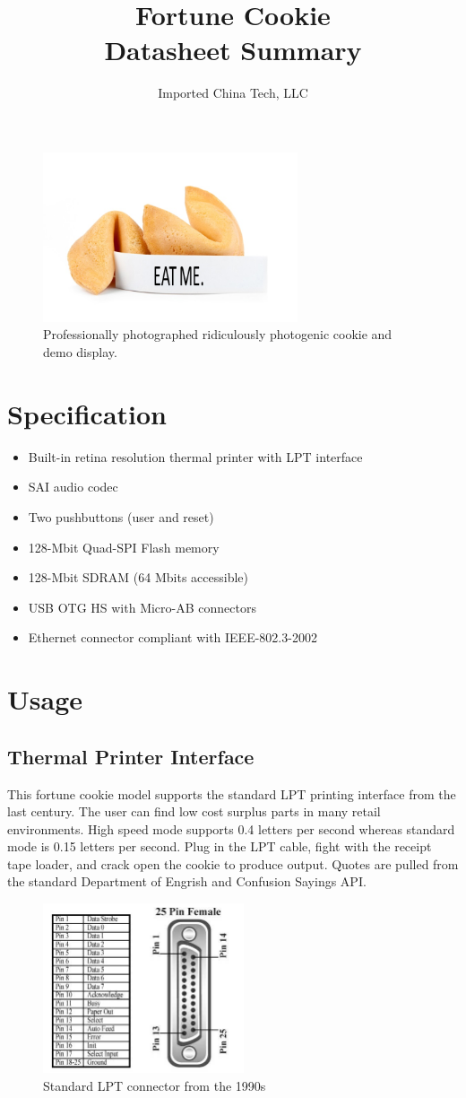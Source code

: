 \documentclass[11pt,twocolumn]{article}
\title{Fortune Cookie\\Datasheet Summary}
\author{Imported China Tech, LLC}
\begin{document}
    \maketitle
  
    \begin{figure}
    \centering
    \includegraphics[height=5cm]{cookie.png}
    \caption{Professionally photographed ridiculously photogenic cookie and demo display.}
    \label{fig:la}
    \end{figure}

\section{Specification}
    \begin{itemize}
        \item Built-in retina resolution thermal printer with LPT interface
        \item SAI audio codec
        \item Two pushbuttons (user and reset)
        \item 128-Mbit Quad-SPI Flash memory
        \item 128-Mbit SDRAM (64 Mbits accessible)
        \item USB OTG HS with Micro-AB connectors
        \item Ethernet connector compliant with IEEE-802.3-2002
    \end{itemize}

\section{Usage}
\subsection{Thermal Printer Interface}
    This fortune cookie model supports the standard LPT printing interface from the last century. The user can find low cost surplus parts in many retail environments. High speed mode supports 0.4 letters per second whereas standard mode is 0.15 letters per second. Plug in the LPT cable, fight with the receipt tape loader, and crack open the cookie to produce output. Quotes are pulled from the standard Department of Engrish and Confusion Sayings API.

    \begin{figure}
    \centering
    \includegraphics[height=5cm]{lptport.jpg}
    \caption{Standard LPT connector from the 1990s}
    \label{fig:lptport}
    \end{figure}
  
\end{document}
